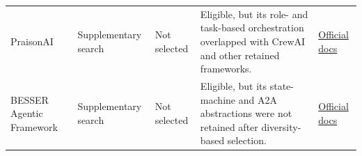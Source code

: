 \begin{longtable}{
    @{}
    p{}
    p{}
    >{\centering\arraybackslash}p{}
    p{}
    p{}
    @{}
}
    PraisonAI
    & Supplementary search
    & Not selected
    & Eligible, but its role- and task-based orchestration overlapped with
    CrewAI and other retained frameworks.
    & \href{https://docs.praison.ai/}{Official docs} \\

    BESSER Agentic Framework
    & Supplementary search
    & Not selected
    & Eligible, but its state-machine and A2A abstractions were not retained
    after diversity-based selection.
    & \href{https://besser-agentic-framework.readthedocs.io/latest/index.html}
    {Official docs} \\
\end{longtable}
\normalsize
